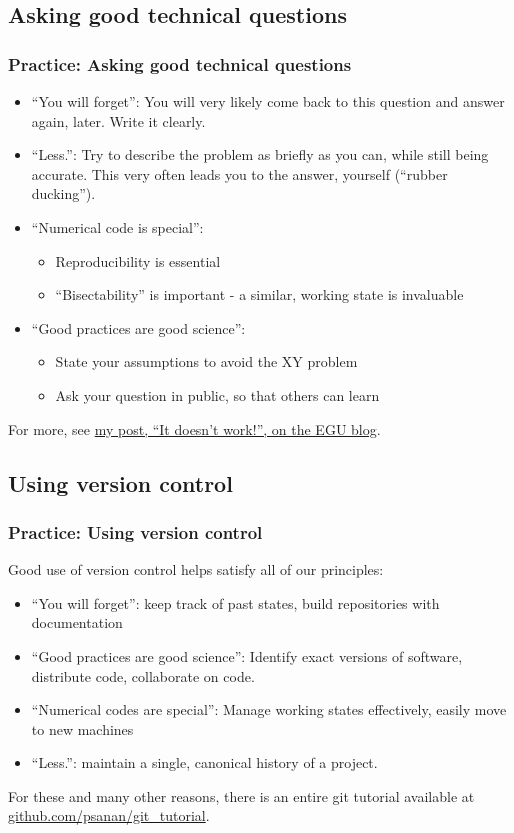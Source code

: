 \documentclass{beamer}
\begin{document}
\subsection{Asking good technical questions}
\begin{frame}[fragile]
\frametitle{Practice: Asking good technical questions}
  \begin{itemize}
    \item ``You will forget'': You will very likely come back to this question and answer again, later. Write it clearly.
\item ``Less.'':
  Try to describe the problem as briefly as you can, while still being accurate. This very often leads you to the answer, yourself (``rubber ducking'').
\item ``Numerical code is special'':
  \begin{itemize}
    \item Reproducibility is essential
    \item ``Bisectability'' is important - a similar, working state is invaluable
  \end{itemize}

\item ``Good practices are good science'':
  \begin{itemize}
    \item State your assumptions to avoid the XY problem
    \item Ask your question in public, so that others can learn
  \end{itemize}
  \end{itemize}

  For more, see \href{https://blogs.egu.eu/divisions/gd/2019/07/03/it-doesnt-work-asking-questions-about-scientific-software/}{my post, ``It doesn't work!'', on the EGU blog}.
\end{frame}

\subsection{Using version control}
\begin{frame}[fragile]
\frametitle{Practice: Using version control}
Good use of version control helps satisfy all of our principles:
  \begin{itemize}
    \item ``You will forget'': keep track of past states, build repositories with documentation
    \item ``Good practices are good science'': Identify exact versions of software, distribute code, collaborate on code.
    \item ``Numerical codes are special'': Manage working states effectively, easily move to new machines
    \item ``Less.'': maintain a single, canonical history of a project.
  \end{itemize}
  For these and many other reasons, there is an entire git tutorial available at \href{https://github.com/psanan/git_tutorial}{github.com/psanan/git\_tutorial}.
\end{frame}
\end{document}
